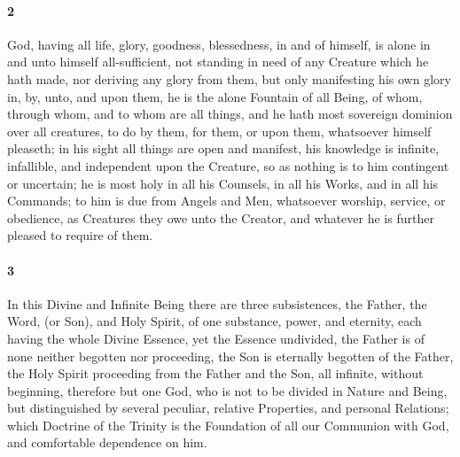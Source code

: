 \documentclass[
    paper=letterpaper,
    11pt,
    twoside,
    DIV=calc,
    openany
]{scrbook}
\begin{document}
\paragraph{2} %
God, having all \R{}life, \R{}glory, \R{}goodness, blessedness, in and of himself, is alone in and unto himself all-sufficient, not \R{}standing in need of any Creature which he hath made, nor deriving any glory from them, but only manifesting his own glory in, by, unto, and upon them, he is the alone Fountain of all Being, \R{}of whom, through whom, and to whom are all things, and he hath most sovereign \R{}dominion over all creatures, to do by them, for them, or upon them, whatsoever himself pleaseth; in his sight \R{}all things are open and manifest, his knowledge is \R{}infinite, infallible, and independent upon the Creature, so as nothing is to him contingent or uncertain; he is most holy in all his Counsels, in \R{}all his Works, and in all his Commands; to him is due \R{}from Angels and Men, whatsoever worship, service, or obedience, as Creatures they owe unto the Creator, and whatever he is further pleased to require of them.

\footnotebegin
{}
\footnoteend

\paragraph{3} %
In this Divine and Infinite Being there are three subsistences, \R{}the Father, the Word, (or Son), and Holy Spirit, of one substance, power, and eternity, each having the whole Divine Essence, \R{}yet the Essence undivided, the Father is of none neither begotten nor proceeding, the Son is \R{}eternally begotten of the Father, the Holy Spirit \R{}proceeding from the Father and the Son, all infinite, without beginning, therefore but one God, who is not to be divided in Nature and Being, but distinguished by several peculiar, relative Properties, and personal Relations; which Doctrine of the Trinity is the Foundation of all our Communion with God, and comfortable dependence on him.

\footnotebegin 
{}
\footnoteend
\end{document}
